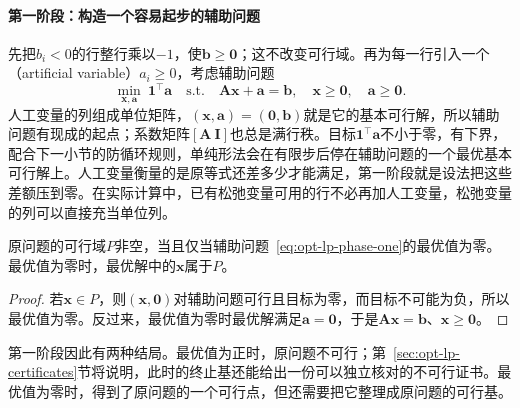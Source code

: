 \paragraph{第一阶段：构造一个容易起步的辅助问题}
先把$b_i<0$的行整行乘以$-1$，使$\bm b\ge\bm 0$；这不改变可行域。再为每一行引入一个（artificial variable）$a_i\ge0$，考虑辅助问题
\begin{equation}
\label{eq:opt-lp-phase-one}
  \min_{\bm x,\bm a}\ \bm 1^\top\bm a
  \quad\text{s.t.}\quad
  \bm A\bm x+\bm a=\bm b,\quad \bm x\ge\bm 0,\quad \bm a\ge\bm 0.
\end{equation}
人工变量的列组成单位矩阵，$(\bm x,\bm a)=(\bm 0,\bm b)$就是它的基本可行解，所以辅助问题有现成的起点；系数矩阵$[\bm A\ \bm I]$也总是满行秩。目标$\bm 1^\top\bm a$不小于零，有下界，配合下一小节的防循环规则，单纯形法会在有限步后停在辅助问题的一个最优基本可行解上。人工变量衡量的是原等式还差多少才能满足，第一阶段就是设法把这些差额压到零。在实际计算中，已有松弛变量可用的行不必再加人工变量，松弛变量的列可以直接充当单位列。

\begin{theorem}[第一阶段的判定]
\label{thm:opt-lp-phase-one}
原问题的可行域$P$非空，当且仅当辅助问题~\eqref{eq:opt-lp-phase-one}的最优值为零。最优值为零时，最优解中的$\bm x$属于$P$。
\end{theorem}

\begin{proof}
若$\bm x\in P$，则$(\bm x,\bm 0)$对辅助问题可行且目标为零，而目标不可能为负，所以最优值为零。反过来，最优值为零时最优解满足$\bm a=\bm 0$，于是$\bm A\bm x=\bm b$、$\bm x\ge\bm 0$。
\end{proof}

第一阶段因此有两种结局。最优值为正时，原问题不可行；第~\ref{sec:opt-lp-certificates}节将说明，此时的终止基还能给出一份可以独立核对的不可行证书。最优值为零时，得到了原问题的一个可行点，但还需要把它整理成原问题的可行基。

